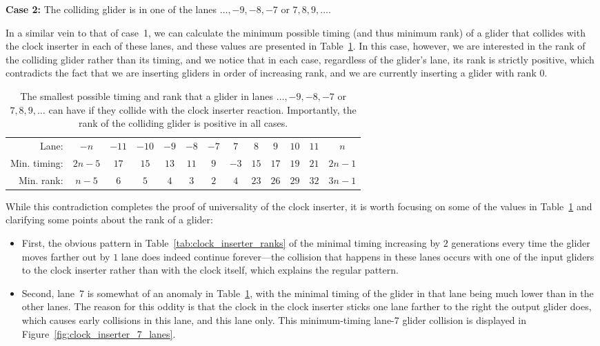 \noindent \textbf{Case 2:} The colliding glider is in one of the lanes $\ldots, -9, -8, -7$ or $7, 8, 9, \ldots$.

In a similar vein to that of case~1, we can calculate the minimum possible timing (and thus minimum rank) of a glider that collides with the clock inserter in each of these lanes, and these values are presented in Table~\ref{tab:clock_inserter_ranks_b}. In this case, however, we are interested in the rank of the colliding glider rather than its timing, and we notice that in each case, regardless of the glider's lane, its rank is strictly positive, which contradicts the fact that we are inserting gliders in order of increasing rank, and we are currently inserting a glider with rank $0$.

\begin{table}[!htb]
	\begin{center}		
		\begin{tabular}{r c c c c c c | c c c c c c}
			\toprule
			Lane: & $-n$ & $-11$ & $-10$ & $-9$ & $-8$ & $-7$ & $7$ & $8$ & $9$ & $10$ & $11$ & $n$ \\
			\rowcolor{gray!20} Min. timing: & $2n-5$ & $17$ & $15$ & $13$ & $11$ & $9$ & $-3$ & $15$ & $17$ & $19$ & $21$ & $2n-1$ \\
			Min. rank: & $n-5$ & $6$ & $5$ & $4$ & $3$ & $2$ & $4$ & $23$ & $26$ & $29$ & $32$ & $3n-1$ \\\bottomrule
		\end{tabular}
		\caption{The smallest possible timing and rank that a glider in lanes $\ldots, -9, -8, -7$ or $7, 8, 9, \ldots$ can have if they collide with the clock inserter reaction. Importantly, the rank of the colliding glider is positive in all cases.}\label{tab:clock_inserter_ranks_b}
	\end{center}
\end{table}

While this contradiction completes the proof of universality of the clock inserter, it is worth focusing on some of the values in Table~\ref{tab:clock_inserter_ranks_b} and clarifying some points about the rank of a glider:\smallskip

\begin{itemize}
	\item First, the obvious pattern in Table~\ref{tab:clock_inserter_ranks} of the minimal timing increasing by $2$ generations every time the glider moves farther out by $1$ lane does indeed continue forever---the collision that happens in these lanes occurs with one of the input gliders to the clock inserter rather than with the clock itself, which explains the regular pattern.\smallskip
	
	\item Second, lane~7 is somewhat of an anomaly in Table~\ref{tab:clock_inserter_ranks_b}, with the minimal timing of the glider in that lane being much lower than in the other lanes. The reason for this oddity is that the clock in the clock inserter sticks one lane farther to the right the output glider does, which causes early collisions in this lane, and this lane only. This minimum-timing lane-7 glider collision is displayed in Figure~\ref{fig:clock_inserter_7_lanes}.\smallskip
\end{itemize}

